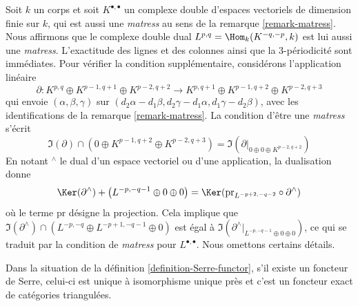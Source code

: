 \begin{remark}
\label{remark-dual-matress}
Soit $k$ un corps et soit $K^{\bullet, \bullet}$ un complexe double
d'espaces vectoriels de dimension finie sur $k$, qui est aussi une {\it matress} au sens de la
remarque \ref{remark-matress}. Nous affirmons que le complexe double dual
$L^{p, q} = \Hom_k(K^{-q, -p}, k)$ est lui aussi une {\it matress}. L'exactitude des
lignes et des colonnes ainsi que la 3-périodicité sont immédiates. Pour vérifier
la condition supplémentaire, considérons l'application linéaire
$$
\partial :
K^{p, q} \oplus K^{p - 1, q + 1} \oplus K^{p - 2, q + 2}
\longrightarrow
K^{p, q + 1} \oplus K^{p - 1, q + 2} \oplus K^{p - 2, q + 3}
$$
qui envoie $(\alpha, \beta, \gamma)$ sur
$(d_2 \alpha - d_1 \beta, d_2 \gamma - d_1 \alpha, d_1 \gamma - d_2 \beta)$,
avec les identifications de la remarque \ref{remark-matress}.
La condition d'être une {\it matress} s'écrit
$$
\Im(\partial) \cap
\left( 0 \oplus K^{p - 1, q + 2} \oplus K^{p - 2, q + 3} \right)
=
\Im(\partial|_{0 \oplus 0 \oplus K^{p - 2, q + 2}})
$$
En notant ${}^\wedge$ le dual d'un espace vectoriel ou d'une application, la dualisation
donne
$$
\Ker(\partial^\wedge) +
\left(L^{-p, -q - 1} \oplus 0 \oplus 0 \right)
=
\Ker(\text{pr}_{L^{-p + 2, -q - 2}} \circ \partial^\wedge)
$$
où le terme $\text{pr}$ désigne la projection. Cela implique
que
$\Im(\partial^\wedge) \cap (L^{-p, -q} \oplus L^{-p + 1, -q - 1} \oplus 0)$
est égal à
$\Im(\partial^\wedge|_{L^{-p, -q - 1} \oplus 0 \oplus 0})$, ce qui
se traduit par la condition de {\it matress} pour $L^{\bullet, \bullet}$.
Nous omettons certains détails.
\end{remark}

\begin{lemma}
\label{lemma-Serre-functor}
Dans la situation de la définition \ref{definition-Serre-functor},
s'il existe un foncteur de Serre, celui-ci est unique à isomorphisme unique près
et c'est un foncteur exact de catégories triangulées.
\end{lemma}

